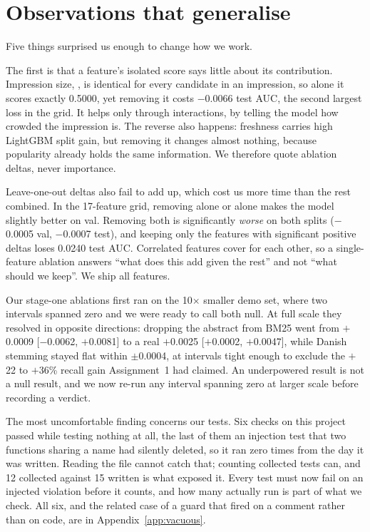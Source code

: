 \section{Observations that generalise}
\label{sec:lessons}

Five things surprised us enough to change how we work.

The first is that a feature's isolated score says little about its contribution. Impression size,
, is identical for every candidate in an impression, so alone it scores exactly
0.5000, yet removing it costs $-$0.0066 test AUC, the second largest loss in the grid. It helps
only through interactions, by telling the model how crowded the impression is. The reverse also
happens: freshness carries high LightGBM split gain, but removing it changes almost nothing,
because popularity already holds the same information. We therefore quote ablation deltas, never
importance.

Leave-one-out deltas also fail to add up, which cost us more time than the rest combined. In the
17-feature grid, removing  alone or  alone makes the model
slightly better on val. Removing both is significantly \emph{worse} on both splits ($-$0.0005 val,
$-$0.0007 test), and keeping only the features with significant positive deltas loses 0.0240 test
AUC. Correlated features cover for each other, so a single-feature ablation answers ``what does
this add given the rest'' and not ``what should we keep''. We ship all features.

Our stage-one ablations first ran on the 10$\times$ smaller \eb{} demo set, where two intervals
spanned zero and we were ready to call both null. At full scale they resolved in opposite
directions: dropping the abstract from BM25 went from $+$0.0009 [$-$0.0062, $+$0.0081] to a real
$+$0.0025 [$+$0.0002, $+$0.0047], while Danish stemming stayed flat within $\pm$0.0004, at
intervals tight enough to exclude the $+$22 to $+$36\% recall gain Assignment~1 had claimed. An
underpowered result is not a null result, and we now re-run any interval spanning zero at larger
scale before recording a verdict.

The most uncomfortable finding concerns our tests. Six checks on this project passed while testing
nothing at all, the last of them an injection test that two functions sharing a name had silently
deleted, so it ran zero times from the day it was written. Reading the file cannot catch that;
counting collected tests can, and 12 collected against 15 written is what exposed it. Every test
must now fail on an injected violation before it counts, and how many actually run is part of what
we check. All six, and the related case of a guard that fired on a comment rather than on code, are
in Appendix~\ref{app:vacuous}.

